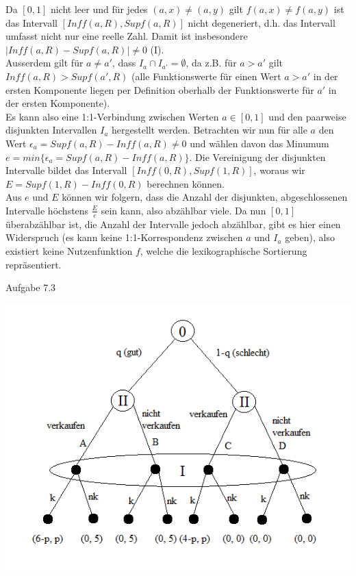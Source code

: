 \documentclass{scrartcl}
\begin{document}
Da $[0,1]$ nicht leer und für jedes $(a, x) \neq (a, y)$ gilt $f(a,x) \neq f(a,y)$ ist das
Intervall $[Inf f(a,R), Sup f(a,R)]$ nicht degeneriert, d.h. das Intervall umfasst nicht nur eine
reelle Zahl. Damit ist insbesondere $|Inf f(a,R) - Sup f(a,R)| \neq 0$ (I). \\

Ausserdem gilt für $a \neq a'$, dass $I_a \cap I_{a'} = \emptyset$, da z.B. für $a > a'$ gilt
$Inf f(a,R) > Sup f(a',R)$ (alle Funktionswerte für einen Wert $a > a'$ in der ersten Komponente
liegen per Definition oberhalb der Funktionswerte für $a'$ in der ersten Komponente). \\

Es kann also eine 1:1-Verbindung zwischen Werten $a \in [0,1]$ und den paarweise disjunkten 
Intervallen $I_a$ hergestellt werden. Betrachten wir nun für alle $a$ den Wert $\epsilon_a =
Sup f(a,R) - Inf f(a,R) \neq 0$ und wählen davon das Minumum $e = min \{\epsilon_a =
Sup f(a,R) - Inf f(a,R)\}$. Die Vereinigung der disjunkten Intervalle bildet das Intervall
$[Inf f(0, R), Sup f(1,R)]$, woraus wir $E = Sup f(1,R) - Inf f(0,R)$ berechnen können. \\

Aus $e$ und $E$ können wir folgern, dass die Anzahl der disjunkten, abgeschlossenen Intervalle
höchstens $\frac{E}{e}$ sein kann, also abzählbar viele. Da nun $[0, 1]$ überabzählbar
ist, die Anzahl der Intervalle jedoch abzählbar, gibt es hier einen Widerspruch (es kann keine
1:1-Korrespondenz zwischen $a$ und $I_a$ geben), also existiert keine Nutzenfunktion $f$, welche
die lexikographische Sortierung repräsentiert. \\

\begin{Large}
Aufgabe 7.3\\[0.0cm]
\end{Large}

\includegraphics{3_tree.png}
\end{document}
